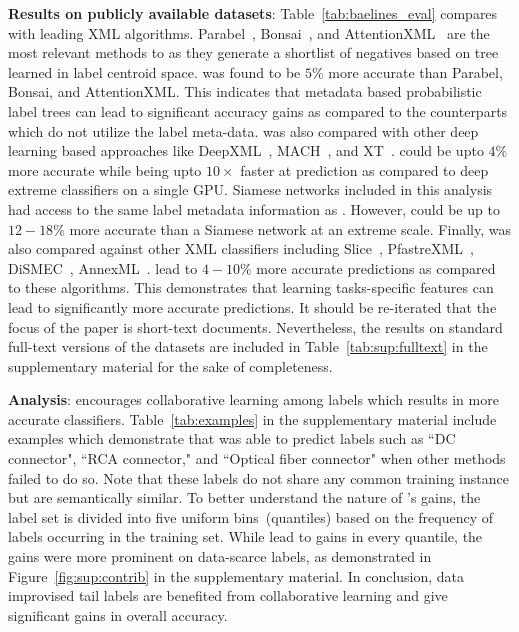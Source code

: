 \textbf{Results on publicly available datasets}: Table~\ref{tab:baelines_eval} compares \alg with leading XML algorithms. Parabel~\citep{Prabhu18}, Bonsai~\citep{Khandagale19}, and AttentionXML~\citep{You18} are the most relevant methods to \alg as they generate a shortlist of negatives based on tree learned in label centroid space. \alg was found to be $5\%$ more accurate than Parabel, Bonsai, and AttentionXML. This indicates that metadata based probabilistic label trees can lead to significant accuracy gains as compared to the counterparts which do not utilize the label meta-data. \alg was also compared with other deep learning based approaches like DeepXML~\cite{dahiya2020}, MACH~\citep{Medini2019}, and XT~\cite{Wydmuch18}. \alg could be upto $4\%$ more accurate while being upto $10\times$ faster at prediction as compared to deep extreme classifiers on a single GPU. Siamese networks included in this analysis had access to the same label metadata information as \alg. However, \alg could be up to $12-18\%$ more accurate than a Siamese network at an extreme scale. Finally, \alg was also compared against other XML classifiers including Slice~\cite{Jain19}, PfastreXML~\cite{Jain17}, DiSMEC~\cite{Babbar17}, AnnexML~\cite{Tagami17}. \alg lead to $4-10\%$ more accurate predictions as compared to these algorithms. This demonstrates that learning tasks-specific features can lead to significantly more accurate predictions. It should be re-iterated that the focus of the paper is short-text documents. Nevertheless, the results on standard full-text versions of the datasets are included in Table~\ref{tab:sup:fulltext} in the supplementary material for the sake of completeness.

\textbf{Analysis}:
\alg encourages collaborative learning among labels which results in more accurate classifiers. Table~\ref{tab:examples} in the supplementary material include examples which demonstrate that \alg was able to predict labels such as ``DC connector", ``RCA connector," and ``Optical fiber connector" when other methods failed to do so. Note that these labels do not share any common training instance but are semantically similar. To better understand the nature of \alg's gains, the label set is divided into five uniform bins~(quantiles) based on the frequency of labels occurring in the training set. While \alg lead to gains in every quantile, the gains were more prominent on data-scarce labels, as demonstrated in Figure~\ref{fig:sup:contrib} in the supplementary material. In conclusion, data improvised tail labels are benefited from collaborative learning and give significant gains in overall accuracy.